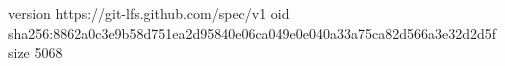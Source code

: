 version https://git-lfs.github.com/spec/v1
oid sha256:8862a0c3e9b58d751ea2d95840e06ca049e0e040a33a75ca82d566a3e32d2d5f
size 5068
